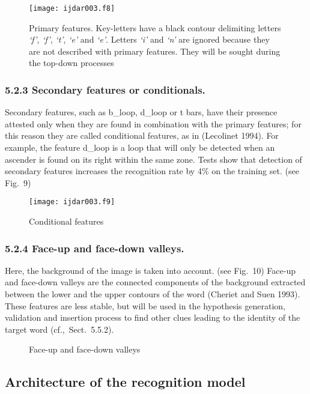 \documentclass[ijdar]{svjour}
\begin{document}
\begin{figure}%
\texttt{[image: ijdar003.f8]}%
\caption{Primary features. Key-letters have a black contour delimiting
letters {\it `f'}, {\it `f'}, {\it `t'}, {\it `e'} and {\it `e'}.
Letters {\it `i'} and {\it `n'} are ignored because they are not
described with primary features. They will be sought during the top-down
processes}
\label{FIGKLDEF}
\end{figure}

\subsubsection{5.2.3 Secondary features or conditionals.}
\label{SECSECOND}

Secondary features, such as b\_loop, d\_loop or t bars, have their presence attested only when they are found in combination with the primary features; for this reason they are called conditional features, as in (Lecolinet 1994).
For example, the feature d\_loop is a loop that will only be detected when an ascender is found on its right within the same zone.
Tests show that detection of secondary features increases the recognition rate by 4\% on the training
set. (see Fig.~9)


\begin{figure}%
\texttt{[image: ijdar003.f9]}%
\caption{Conditional features}
\label{FIGSECDEF}
\end{figure}

\subsubsection{5.2.4 Face-up and face-down valleys.}
\label{SECFUP}

Here, the background of the image is taken into account. (see Fig.~10)
Face-up and face-down valleys are the connected components of the background extracted between the lower and the upper contours of the word (Cheriet and Suen 1993).
These features are less stable, but will be used in the hypothesis generation, validation and insertion process to find other clues leading to the identity of the target word \mbox{({cf.},
Sect.~5.5.2)}.

\begin{figure}%
\caption{Face-up and face-down valleys}
\label{FIGPIC}
\end{figure}
\subsection{Architecture of the recognition model}
\end{document}
